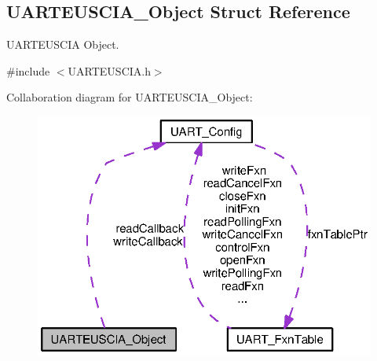 \subsection{U\+A\+R\+T\+E\+U\+S\+C\+I\+A\+\_\+\+Object Struct Reference}
\label{struct_u_a_r_t_e_u_s_c_i_a___object}


U\+A\+R\+T\+E\+U\+S\+C\+I\+A Object.  




{\ttfamily \#include $<$U\+A\+R\+T\+E\+U\+S\+C\+I\+A.\+h$>$}



Collaboration diagram for U\+A\+R\+T\+E\+U\+S\+C\+I\+A\+\_\+\+Object\+:
\nopagebreak
\begin{figure}[H]
\begin{center}
\leavevmode
\includegraphics[width=322pt]{struct_u_a_r_t_e_u_s_c_i_a___object__coll__graph}
\end{center}
\end{figure}
